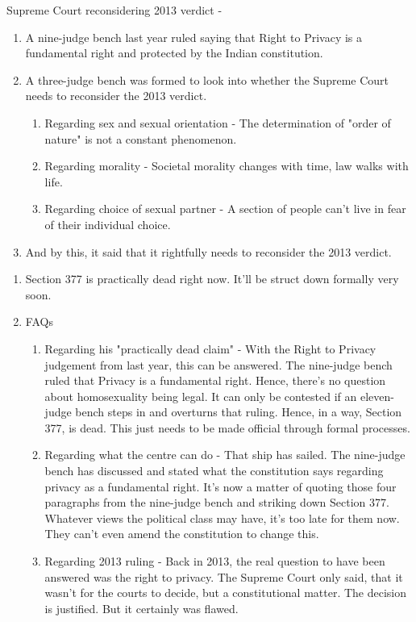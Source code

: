 \documentclass[11pt]{article}
\begin{document}
Supreme Court reconsidering 2013 verdict -
\begin{enumerate}[noitemsep]
	\item A nine-judge bench last year ruled saying that Right to Privacy is a fundamental right and protected by the Indian constitution. 
	\item A three-judge bench was formed to look into whether the Supreme Court needs to reconsider the 2013 verdict. 
	\begin{enumerate}[noitemsep]
		\item Regarding sex and sexual orientation - The determination of "order of nature" is not a constant phenomenon.
		\item Regarding morality - Societal morality changes with time, law walks with life.
		\item Regarding choice of sexual partner - A section of people can't live in fear of their individual choice.
	\end{enumerate}
	\item And by this, it said that it rightfully needs to reconsider the 2013 verdict.
\end{enumerate}

\begin{enumerate}[noitemsep]
	\item Section 377 is practically dead right now. It'll be struct down formally very soon.
	\item FAQs
	\begin{enumerate}[noitemsep]
		\item Regarding his "practically dead claim" - With the Right to Privacy judgement from last year, this can be answered. The nine-judge bench ruled that Privacy is a fundamental right. Hence, there's no question about homosexuality being legal. It can only be contested if an eleven-judge bench steps in and overturns that ruling. Hence, in a way, Section 377, is dead. This just needs to be made official through formal processes.
		\item Regarding what the centre can do - That ship has sailed. The nine-judge bench has discussed and stated what the constitution says regarding privacy as a fundamental right. It's now a matter of quoting those four paragraphs from the nine-judge bench and striking down Section 377. Whatever views the political class may have, it's too late for them now. They can't even amend the constitution to change this.
		\item Regarding 2013 ruling - Back in 2013, the real question to have been answered was the right to privacy. The Supreme Court only said, that it wasn't for the courts to decide, but a constitutional matter. The decision is justified. But it certainly was flawed.
	\end{enumerate}
\end{enumerate}
\end{document}
